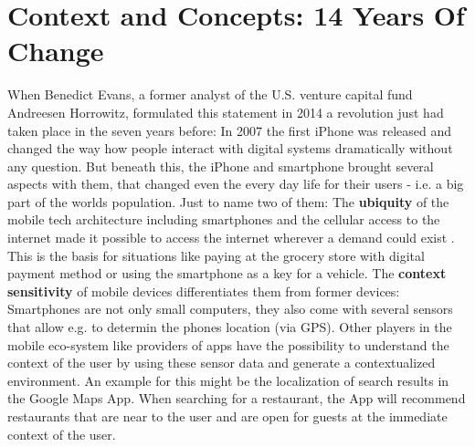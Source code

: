 \documentclass[11pt,letterpaper]{article}
\begin{document}
\section*{Context and Concepts: 14 Years Of Change}
\begin{center}
 \autocite[][]{Evans.2014}
 \end{center}
When Benedict Evans, a former analyst of the U.S. venture capital fund Andreesen Horrowitz, formulated this statement in 2014 a revolution just had taken place in the seven years before: In 2007 the first iPhone was released and changed the way how people interact with digital systems dramatically without any question. But beneath this, the iPhone and smartphone brought several aspects with them, that changed even the every day life for their users - i.e. a big part of the worlds population. Just to name two of them: The \textbf{ubiquity} of the mobile tech architecture including smartphones and the cellular access to the internet made it possible to access the internet wherever a demand could exist \autocite[][p.1]{Okazaki.2013}. This is the basis for situations like paying at the grocery store with digital payment method or using the smartphone as a key for a vehicle. The \textbf{context sensitivity} of mobile devices differentiates them from former devices: Smartphones are not only small computers, they also come with several sensors that allow e.g. to determin the phones location (via GPS)\autocite[][p.1]{Minch.2004}. Other players in the mobile eco-system like providers of apps have the possibility to understand the context of the user by using these sensor data and generate a contextualized environment. An example for this might be the localization of search results in the Google Maps App. When searching for a restaurant, the App will recommend restaurants that are near to the user and are open for guests at the immediate context of the user.
\end{document}
